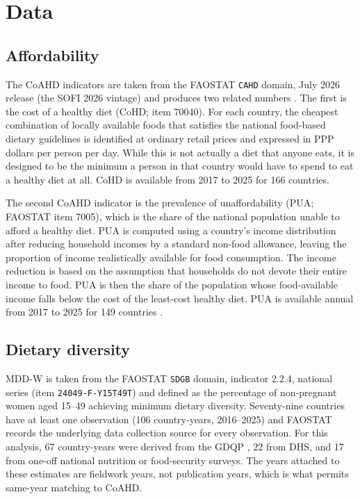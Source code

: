 \documentclass[11pt]{article}
\begin{document}
\section{Data}\label{sec:data}

\subsection{Affordability}
The CoAHD indicators are taken from the FAOSTAT \texttt{CAHD} domain, July 2026 release (the SOFI 2026 vintage) and produces two related numbers \citep{faostat2026}. The first is the cost of a healthy diet (CoHD; item 70040). For each country, the cheapest combination of locally available foods that satisfies the national food-based dietary guidelines is identified at ordinary retail prices and expressed in PPP dollars per person per day.  While this is not actually a diet that anyone eats, it is designed to be the minimum a person in that country would have to spend to eat a healthy diet at all. CoHD is available from 2017 to 2025 for 166 countries.

The second CoAHD indicator is the prevalence of unaffordability (PUA; FAOSTAT item 7005), which is the share of the national population unable to afford a healthy diet.  PUA is computed using a country's income distribution after reducing household incomes by a standard non-food allowance, leaving the proportion of income realistically available for food consumption.  The income reduction is based on the assumption that households do not devote their entire income to food.  PUA is then the share of the population whose food-available income falls below the cost of the least-cost healthy diet.  PUA is available annual from 2017 to 2025 for 149 countries \citep{herforth2020}.

\subsection{Dietary diversity}
MDD-W is taken from the FAOSTAT \texttt{SDGB} domain, indicator 2.2.4, national series (item \texttt{24049-F-Y15T49T}) and defined as the percentage of non-pregnant women aged 15--49 achieving minimum dietary diversity. Seventy-nine countries have at least one observation (106 country-years, 2016--2025) and FAOSTAT records the underlying data collection source for every observation.  For this analysis, 67 country-years were derived from the GDQP \citep{gdqp}, 22 from DHS, and 17 from one-off national nutrition or food-security surveys. The years attached to these estimates are fieldwork years, not publication years, which is what permits same-year matching to CoAHD.
\end{document}

